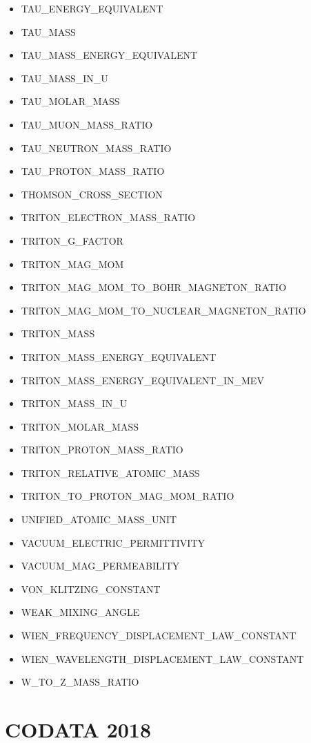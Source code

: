 \begin{itemize}
  TAU\_ELECTRON\_MASS\_RATIO
\item
  TAU\_ENERGY\_EQUIVALENT
\item
  TAU\_MASS
\item
  TAU\_MASS\_ENERGY\_EQUIVALENT
\item
  TAU\_MASS\_IN\_U
\item
  TAU\_MOLAR\_MASS
\item
  TAU\_MUON\_MASS\_RATIO
\item
  TAU\_NEUTRON\_MASS\_RATIO
\item
  TAU\_PROTON\_MASS\_RATIO
\item
  THOMSON\_CROSS\_SECTION
\item
  TRITON\_ELECTRON\_MASS\_RATIO
\item
  TRITON\_G\_FACTOR
\item
  TRITON\_MAG\_MOM
\item
  TRITON\_MAG\_MOM\_TO\_BOHR\_MAGNETON\_RATIO
\item
  TRITON\_MAG\_MOM\_TO\_NUCLEAR\_MAGNETON\_RATIO
\item
  TRITON\_MASS
\item
  TRITON\_MASS\_ENERGY\_EQUIVALENT
\item
  TRITON\_MASS\_ENERGY\_EQUIVALENT\_IN\_MEV
\item
  TRITON\_MASS\_IN\_U
\item
  TRITON\_MOLAR\_MASS
\item
  TRITON\_PROTON\_MASS\_RATIO
\item
  TRITON\_RELATIVE\_ATOMIC\_MASS
\item
  TRITON\_TO\_PROTON\_MAG\_MOM\_RATIO
\item
  UNIFIED\_ATOMIC\_MASS\_UNIT
\item
  VACUUM\_ELECTRIC\_PERMITTIVITY
\item
  VACUUM\_MAG\_PERMEABILITY
\item
  VON\_KLITZING\_CONSTANT
\item
  WEAK\_MIXING\_ANGLE
\item
  WIEN\_FREQUENCY\_DISPLACEMENT\_LAW\_CONSTANT
\item
  WIEN\_WAVELENGTH\_DISPLACEMENT\_LAW\_CONSTANT
\item
  W\_TO\_Z\_MASS\_RATIO
\end{itemize}

\section{CODATA 2018}

